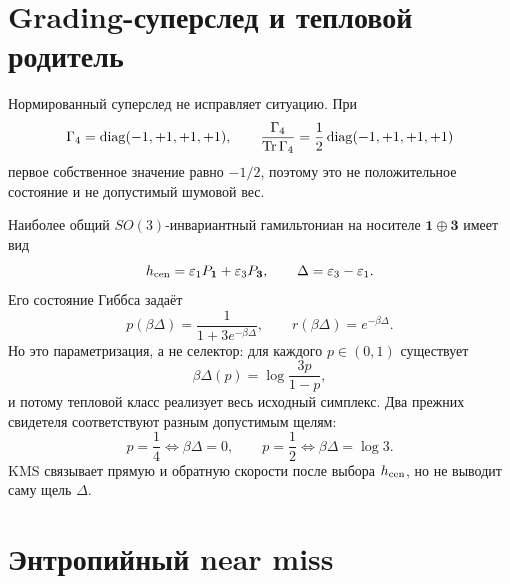 \section{Grading-суперслед и тепловой родитель}

Нормированный суперслед не исправляет ситуацию. При
\begin{equation}
 \Gamma_4=\operatorname{diag}(-1,+1,+1,+1),
 \qquad \frac{\Gamma_4}{\operatorname{Tr}\Gamma_4}
 =\frac12\operatorname{diag}(-1,+1,+1,+1)
 \label{eq:v8-baryon-c0-normalized-supertrace-density}
\end{equation}
первое собственное значение равно $-1/2$, поэтому это не положительное
состояние и не допустимый шумовой вес.

Наиболее общий $SO(3)$-инвариантный гамильтониан на носителе
$\mathbf1\oplus\mathbf3$ имеет вид
\begin{equation}
 h_{\rm cen}=\varepsilon_1P_{\mathbf1}
 +\varepsilon_3P_{\mathbf3},
 \qquad \Delta=\varepsilon_3-\varepsilon_1.
 \label{eq:v8-baryon-c0-central-two-level-hamiltonian}
\end{equation}
Его состояние Гиббса задаёт
\begin{equation}
 p(\beta\Delta)=\frac{1}{1+3e^{-\beta\Delta}},
 \qquad r(\beta\Delta)=e^{-\beta\Delta}.
 \label{eq:v8-baryon-c0-central-gibbs-weight-and-rate}
\end{equation}
Но это параметризация, а не селектор: для каждого $p\in(0,1)$ существует
\begin{equation}
 \beta\Delta(p)=\log\frac{3p}{1-p},
 \label{eq:v8-baryon-c0-central-gap-realizes-any-weight}
\end{equation}
и потому тепловой класс реализует весь исходный симплекс. Два прежних
свидетеля соответствуют разным допустимым щелям:
\begin{equation}
 p=\frac14\Longleftrightarrow\beta\Delta=0,
 \qquad
 p=\frac12\Longleftrightarrow\beta\Delta=\log3.
 \label{eq:v8-baryon-c0-central-gibbs-gap-witnesses}
\end{equation}
KMS связывает прямую и обратную скорости после выбора $h_{\rm cen}$, но не
выводит саму щель $\Delta$.

\section{Энтропийный near miss}

